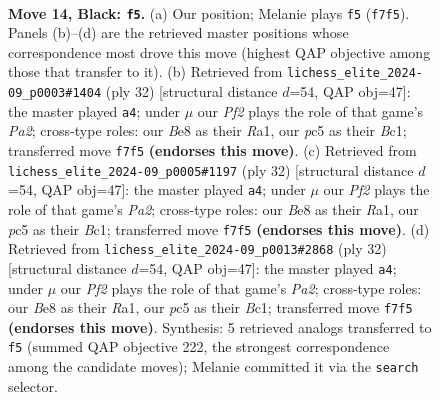 \documentclass[11pt]{article}
\begin{document}
\begin{figure}[p]
\label{fig:thought-m25}
\end{figure}

\clearpage

\begin{figure}[p]\centering
\begin{subfigure}{0.46\textwidth}\centering
\resizebox{\linewidth}{!}{%
\newchessgame
\chessboard[
  setfen={rn2bbr1/1p2kppp/p3p3/2P4n/P1B5/2N1PP2/1P4PP/R1B1NRK1 b - - 4 14},
  showmover=false,
  pgfstyle=straightmove, color=movearrow, markmove={f7-f5}
]}
\caption{}
\end{subfigure}\hfill
\begin{subfigure}{0.46\textwidth}\centering
\resizebox{\linewidth}{!}{%
\newchessgame
\chessboard[
  setfen={r1b2rk1/5ppp/p3pn2/1pb5/8/3BPN2/PP3PPP/R1BR2K1 w - - 0 17},
  showmover=false,
  pgfstyle=straightmove, color=movearrow, markmove={a2-a4}
]}
\caption{}
\end{subfigure}
\\[4pt]
\begin{subfigure}{0.46\textwidth}\centering
\resizebox{\linewidth}{!}{%
\newchessgame
\chessboard[
  setfen={r1b2rk1/5ppp/p3pn2/1pb5/8/3BPN2/PP3PPP/R1BR2K1 w - - 0 17},
  showmover=false,
  pgfstyle=straightmove, color=movearrow, markmove={a2-a4}
]}
\caption{}
\end{subfigure}\hfill
\begin{subfigure}{0.46\textwidth}\centering
\resizebox{\linewidth}{!}{%
\newchessgame
\chessboard[
  setfen={r1b2rk1/5ppp/p3pn2/1pb5/8/3BPN2/PP3PPP/R1BR2K1 w - - 0 17},
  showmover=false,
  pgfstyle=straightmove, color=movearrow, markmove={a2-a4}
]}
\caption{}
\end{subfigure}
\caption{\textbf{Move 14, Black: \texttt{f5}.} (a) Our position; Melanie plays \texttt{f5} (\texttt{f7f5}). Panels (b)--(d) are the retrieved master positions whose correspondence most drove this move (highest QAP objective among those that transfer to it). (b) Retrieved from \texttt{lichess\_elite\_2024-09\_p0003\#1404} (ply 32) [structural distance $d$=54, QAP obj=47]: the master played \texttt{a4}; under $\mu$ our \emph{Pf2} plays the role of that game's \emph{Pa2}; cross-type roles: our \emph{B}e8 as their \emph{R}a1, our \emph{p}c5 as their \emph{B}c1; transferred move \texttt{f7f5} \textbf{(endorses this move)}. (c) Retrieved from \texttt{lichess\_elite\_2024-09\_p0005\#1197} (ply 32) [structural distance $d$=54, QAP obj=47]: the master played \texttt{a4}; under $\mu$ our \emph{Pf2} plays the role of that game's \emph{Pa2}; cross-type roles: our \emph{B}e8 as their \emph{R}a1, our \emph{p}c5 as their \emph{B}c1; transferred move \texttt{f7f5} \textbf{(endorses this move)}. (d) Retrieved from \texttt{lichess\_elite\_2024-09\_p0013\#2868} (ply 32) [structural distance $d$=54, QAP obj=47]: the master played \texttt{a4}; under $\mu$ our \emph{Pf2} plays the role of that game's \emph{Pa2}; cross-type roles: our \emph{B}e8 as their \emph{R}a1, our \emph{p}c5 as their \emph{B}c1; transferred move \texttt{f7f5} \textbf{(endorses this move)}. Synthesis: 5 retrieved analogs transferred to \texttt{f5} (summed QAP objective 222, the strongest correspondence among the candidate moves); Melanie committed it via the \texttt{search} selector.}

\end{figure}
\end{document}
